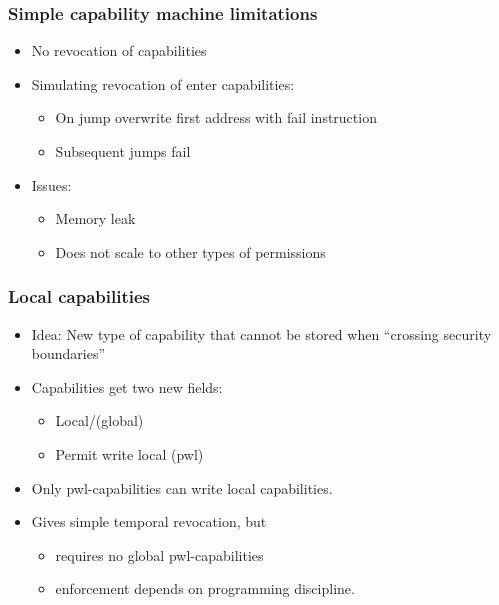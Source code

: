 \documentclass{beamer}
\begin{document}
\begin{frame}
  \frametitle{ Simple capability machine limitations }
  \begin{itemize}[<+->]
  \item No revocation of capabilities
  \item Simulating revocation of enter capabilities:
    \begin{itemize}
    \item On jump overwrite first address with fail instruction
    \item Subsequent jumps fail
    \end{itemize}
  \item Issues:
    \begin{itemize}
    \item Memory leak
    \item Does not scale to other types of permissions  
    \end{itemize}
  \end{itemize}
\end{frame}

\begin{frame}
  \frametitle{ Local capabilities }
  \begin{itemize}[<+->]
  \item Idea: New type of capability that cannot be stored when ``crossing security boundaries''
  \item Capabilities get two new fields:
    \begin{itemize}
    \item Local/(global)
    \item Permit write local (pwl)
    \end{itemize}
  \item Only pwl-capabilities can write local capabilities.
  \item Gives simple temporal revocation, but 
    \begin{itemize}
    \item requires no global pwl-capabilities
    \item enforcement depends on programming discipline.
    \end{itemize}
  \end{itemize}
\end{frame}
\end{document}
